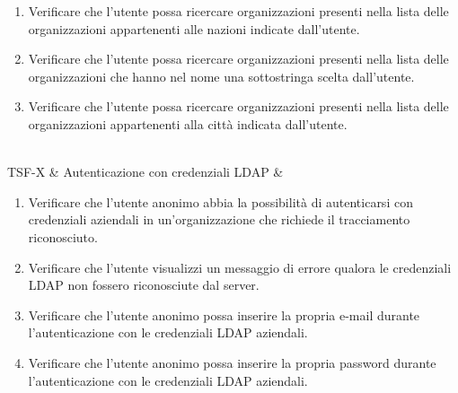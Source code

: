\begin{enumerate}
\item Verificare che l'utente possa ricercare organizzazioni presenti nella lista delle organizzazioni appartenenti alle nazioni indicate dall'utente.
\item  Verificare che l'utente possa ricercare organizzazioni presenti nella lista delle organizzazioni che hanno nel nome una sottostringa scelta dall'utente.
\item  Verificare che l'utente possa ricercare organizzazioni presenti nella lista delle organizzazioni appartenenti alla città indicata dall'utente.
\end{enumerate} \\
TSF-X & Autenticazione con credenziali LDAP & \begin{enumerate}
\item Verificare che l'utente anonimo abbia la possibilità di autenticarsi con credenziali aziendali in un'organizzazione che richiede il tracciamento riconosciuto.
\item Verificare che l'utente visualizzi un messaggio di errore qualora le credenziali LDAP non fossero riconosciute dal server.
\item Verificare che l'utente anonimo possa inserire la propria e-mail durante l'autenticazione con le credenziali LDAP aziendali.
\item Verificare che l'utente anonimo possa inserire la propria password durante l'autenticazione con le credenziali LDAP aziendali.
\end{enumerate} \\

